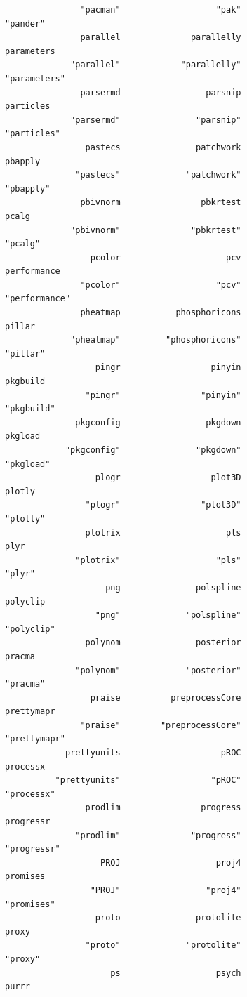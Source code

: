\documentclass[
  letterpaper,
  DIV=11,
  numbers=noendperiod]{scrreprt}
\begin{document}
\begin{verbatim}
               "pacman"                   "pak"                "pander" 
               parallel              parallelly              parameters 
             "parallel"            "parallelly"            "parameters" 
               parsermd                 parsnip               particles 
             "parsermd"               "parsnip"             "particles" 
                pastecs               patchwork                 pbapply 
              "pastecs"             "patchwork"               "pbapply" 
               pbivnorm                pbkrtest                   pcalg 
             "pbivnorm"              "pbkrtest"                 "pcalg" 
                 pcolor                     pcv             performance 
               "pcolor"                   "pcv"           "performance" 
               pheatmap           phosphoricons                  pillar 
             "pheatmap"         "phosphoricons"                "pillar" 
                  pingr                  pinyin                pkgbuild 
                "pingr"                "pinyin"              "pkgbuild" 
              pkgconfig                 pkgdown                 pkgload 
            "pkgconfig"               "pkgdown"               "pkgload" 
                  plogr                  plot3D                  plotly 
                "plogr"                "plot3D"                "plotly" 
                plotrix                     pls                    plyr 
              "plotrix"                   "pls"                  "plyr" 
                    png               polspline                polyclip 
                  "png"             "polspline"              "polyclip" 
                polynom               posterior                  pracma 
              "polynom"             "posterior"                "pracma" 
                 praise          preprocessCore              prettymapr 
               "praise"        "preprocessCore"            "prettymapr" 
            prettyunits                    pROC                processx 
          "prettyunits"                  "pROC"              "processx" 
                prodlim                progress               progressr 
              "prodlim"              "progress"             "progressr" 
                   PROJ                   proj4                promises 
                 "PROJ"                 "proj4"              "promises" 
                  proto               protolite                   proxy 
                "proto"             "protolite"                 "proxy" 
                     ps                   psych                   purrr 

\end{verbatim}
\end{document}
